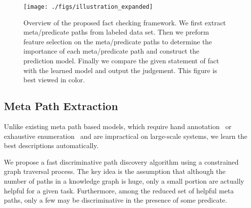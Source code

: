 \documentclass[reprint,twocolumn,showpacs,preprintnumbers,amsmath, aps,pre,amssymb]{revtex4-1}
\begin{document}

\begin{figure*}[t]
\centering
\begin{minipage}[c]{0.92\textwidth}
\centering
\texttt{[image: ./figs/illustration\_expanded]}
    \caption{Overview of the proposed fact checking framework. We first extract meta/predicate paths from labeled data set. Then we preform feature selection on the meta/predicate paths to determine the importance of each meta/predicate path and construct the prediction model. Finally we compare the given statement of fact with the learned model and output the judgement. This figure is best viewed in color.}
    \label{fig:system}
\end{minipage}
\end{figure*}

\subsection{Meta Path Extraction} \label{sec:meta_path_extraction}


Unlike existing meta path based models, which require hand annotation~\cite{Sun2011,Shi2014} or exhaustive enumeration~\cite{Lao2010} and are impractical on large-scale systems, we learn the best descriptions automatically.

We propose a fast discriminative path discovery algorithm using a constrained graph traversal process. The key idea is the assumption that although the number of paths in a knowledge graph is huge, only a small portion are actually helpful for a given task. Furthermore, among the reduced set of helpful meta paths, only a few may be discriminative in the presence of some predicate.
\end{document}
